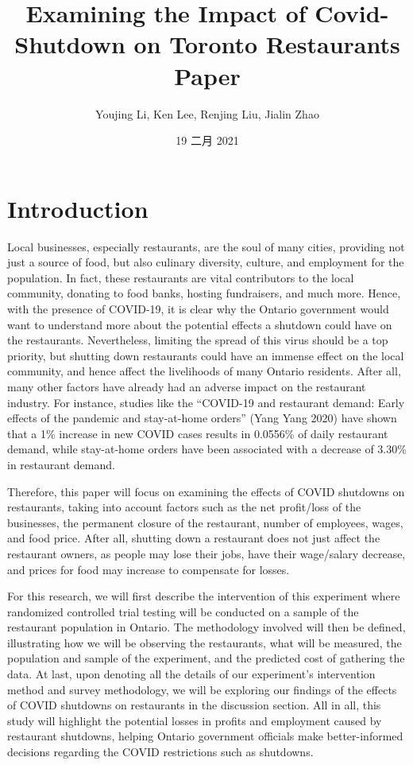 \documentclass[
]{article}
\title{Examining the Impact of Covid-Shutdown on Toronto Restaurants Paper}
\author{Youjing Li, Ken Lee, Renjing Liu, Jialin Zhao}
\date{19 二月 2021}
\begin{document}
\maketitle

\newpage

\hypertarget{introduction}{%
\section{Introduction}\label{introduction}}

Local businesses, especially restaurants, are the soul of many cities, providing not just a source of food, but also culinary diversity, culture, and employment for the population. In fact, these restaurants are vital contributors to the local community, donating to food banks, hosting fundraisers, and much more. Hence, with the presence of COVID-19, it is clear why the Ontario government would want to understand more about the potential effects a shutdown could have on the restaurants. Nevertheless, limiting the spread of this virus should be a top priority, but shutting down restaurants could have an immense effect on the local community, and hence affect the livelihoods of many Ontario residents. After all, many other factors have already had an adverse impact on the restaurant industry. For instance, studies like the ``COVID-19 and restaurant demand: Early effects of the pandemic and stay-at-home orders'' (Yang Yang 2020) have shown that a 1\% increase in new COVID cases results in 0.0556\% of daily restaurant demand, while stay-at-home orders have been associated with a decrease of 3.30\% in restaurant demand.

Therefore, this paper will focus on examining the effects of COVID shutdowns on restaurants, taking into account factors such as the net profit/loss of the businesses, the permanent closure of the restaurant, number of employees, wages, and food price. After all, shutting down a restaurant does not just affect the restaurant owners, as people may lose their jobs, have their wage/salary decrease, and prices for food may increase to compensate for losses.

For this research, we will first describe the intervention of this experiment where randomized controlled trial testing will be conducted on a sample of the restaurant population in Ontario. The methodology involved will then be defined, illustrating how we will be observing the restaurants, what will be measured, the population and sample of the experiment, and the predicted cost of gathering the data. At last, upon denoting all the details of our experiment's intervention method and survey methodology, we will be exploring our findings of the effects of COVID shutdowns on restaurants in the discussion section. All in all, this study will highlight the potential losses in profits and employment caused by restaurant shutdowns, helping Ontario government officials make better-informed decisions regarding the COVID restrictions such as shutdowns.
\end{document}
